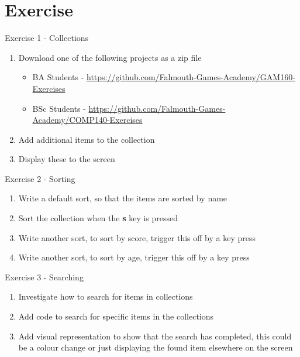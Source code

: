 \part{Exercise}
\frame{\partpage}

\begin{frame}{Exercise 1 - Collections}
	\begin{enumerate}
		\item Download one of the following projects as a zip file
		\begin{itemize}
			\item BA Students - \url{https://github.com/Falmouth-Games-Academy/GAM160-Exercises}
			\item BSc Students - \url{https://github.com/Falmouth-Games-Academy/COMP140-Exercises}
		\end{itemize}
		\item Add additional items to the collection
		\item Display these to the screen
	\end{enumerate}
\end{frame}

\begin{frame}{Exercise 2 - Sorting}
\begin{enumerate}
	\item Write a default sort, so that the items are sorted by name
	\item Sort the collection when the \textbf{s} key is pressed
	\item Write another sort, to sort by score, trigger this off by a key press
	\item Write another sort, to sort by age, trigger this off by a key press
\end{enumerate}
\end{frame}

\begin{frame}{Exercise 3 - Searching}
\begin{enumerate}
	\item Investigate how to search for items in collections
	\item Add code to search for specific items in the collections 
	\item Add visual representation to show that the search has completed, this could be a colour change or just displaying the found item elsewhere on the screen
\end{enumerate}
\end{frame}
